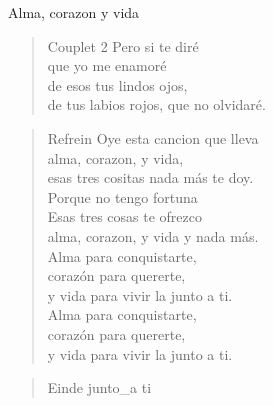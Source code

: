 \begin{song}[vals]{Alma, corazon y vida}
\begin{verse}{Couplet 2}
\hspace{0.6cm}Pero si te diré\\
\hspace{0.6cm}que yo me enamoré\\
\hspace{0.6cm}de esos tus lindos ojos,\\
\hspace{0.6cm}de tus labios rojos, que no olvidaré.\hspace{0.5cm}
\end{verse}
\begin{verse}{Refrein}
Oye esta cancion que lleva\\
alma, corazon, y vida,\\
esas tres cositas nada más te doy.\\
Porque no tengo fortuna\\
Esas tres cosas te ofrezco\\
alma, corazon, y vida y nada más.\\
Alma para conquistarte,\\ 
corazón para quererte,\\ 
y vida para vivir la junto a ti.\hspace{0.6cm}    \\
Alma para conquistarte,\\
corazón para quererte,\\
y vida para vivir la junto a ti.\\
\end{verse}

\begin{verse}{Einde}
junto\_a ti\hspace{1.5em}  \hspace{1.5em} \\
\end{verse}
\end{song}

